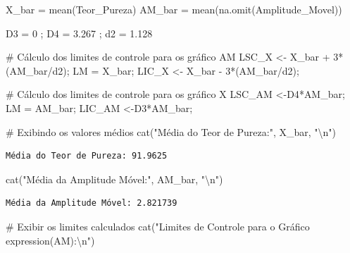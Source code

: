 \documentclass[
  letterpaper,
  DIV=11,
  numbers=noendperiod]{scrartcl}
\newenvironment{Shaded}{\begin{snugshade}}{\end{snugshade}}
\newcommand{\CommentTok}[1]{\textcolor[rgb]{0.37,0.37,0.37}{#1}}
\newcommand{\DecValTok}[1]{\textcolor[rgb]{0.68,0.00,0.00}{#1}}
\newcommand{\FloatTok}[1]{\textcolor[rgb]{0.68,0.00,0.00}{#1}}
\newcommand{\FunctionTok}[1]{\textcolor[rgb]{0.28,0.35,0.67}{#1}}
\newcommand{\NormalTok}[1]{\textcolor[rgb]{0.00,0.23,0.31}{#1}}
\newcommand{\OtherTok}[1]{\textcolor[rgb]{0.00,0.23,0.31}{#1}}
\newcommand{\SpecialCharTok}[1]{\textcolor[rgb]{0.37,0.37,0.37}{#1}}
\newcommand{\StringTok}[1]{\textcolor[rgb]{0.13,0.47,0.30}{#1}}
\begin{document}
\begin{Shaded}
\begin{Highlighting}[]
\NormalTok{X\_bar }\OtherTok{=} \FunctionTok{mean}\NormalTok{(Teor\_Pureza)}
\NormalTok{AM\_bar }\OtherTok{=} \FunctionTok{mean}\NormalTok{(}\FunctionTok{na.omit}\NormalTok{(Amplitude\_Movel))}

\NormalTok{D3 }\OtherTok{=} \DecValTok{0}\NormalTok{ ; D4 }\OtherTok{=} \FloatTok{3.267}\NormalTok{ ; d2 }\OtherTok{=} \FloatTok{1.128}
  
\CommentTok{\# Cálculo dos limites de controle para os gráfico AM}
\NormalTok{LSC\_X }\OtherTok{\textless{}{-}}\NormalTok{ X\_bar }\SpecialCharTok{+} \DecValTok{3}\SpecialCharTok{*}\NormalTok{(AM\_bar}\SpecialCharTok{/}\NormalTok{d2);}
\NormalTok{LM }\OtherTok{=}\NormalTok{ X\_bar;}
\NormalTok{LIC\_X }\OtherTok{\textless{}{-}}\NormalTok{ X\_bar }\SpecialCharTok{{-}} \DecValTok{3}\SpecialCharTok{*}\NormalTok{(AM\_bar}\SpecialCharTok{/}\NormalTok{d2);}

\CommentTok{\# Cálculo dos limites de controle para os gráfico X}
\NormalTok{LSC\_AM }\OtherTok{\textless{}{-}}\NormalTok{D4}\SpecialCharTok{*}\NormalTok{AM\_bar;}
\NormalTok{LM }\OtherTok{=}\NormalTok{ AM\_bar;}
\NormalTok{LIC\_AM }\OtherTok{\textless{}{-}}\NormalTok{D3}\SpecialCharTok{*}\NormalTok{AM\_bar;}

\CommentTok{\# Exibindo os valores médios}
\FunctionTok{cat}\NormalTok{(}\StringTok{"Média do Teor de Pureza:"}\NormalTok{, X\_bar, }\StringTok{"}\SpecialCharTok{\textbackslash{}n}\StringTok{"}\NormalTok{)}
\end{Highlighting}
\end{Shaded}

\begin{verbatim}
Média do Teor de Pureza: 91.9625 
\end{verbatim}

\begin{Shaded}
\begin{Highlighting}[]
\FunctionTok{cat}\NormalTok{(}\StringTok{"Média da Amplitude Móvel:"}\NormalTok{, AM\_bar, }\StringTok{"}\SpecialCharTok{\textbackslash{}n}\StringTok{"}\NormalTok{)}
\end{Highlighting}
\end{Shaded}

\begin{verbatim}
Média da Amplitude Móvel: 2.821739 
\end{verbatim}

\begin{Shaded}
\begin{Highlighting}[]
\CommentTok{\# Exibir os limites calculados}
\FunctionTok{cat}\NormalTok{(}\StringTok{"Limites de Controle para o Gráfico expression(AM):}\SpecialCharTok{\textbackslash{}n}\StringTok{"}\NormalTok{)}
\end{Highlighting}
\end{Shaded}
\end{document}
